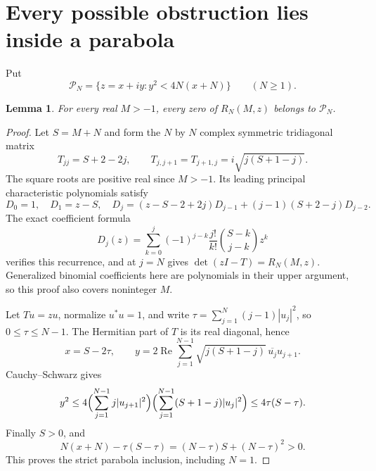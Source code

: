 \documentclass[11pt]{article}
\newtheorem{lemma}[theorem]{Lemma}
\begin{document}
\section{Every possible obstruction lies inside a parabola}
Put
\[
 \mathcal P_N=\{z=x+iy:y^2<4N(x+N)\}\qquad(N\ge1).
\]
\begin{lemma}\label{lem:inside}
For every real $M>-1$, every zero of $R_N(M,z)$ belongs to
$\mathcal P_N$.
\end{lemma}
\begin{proof}
Let $S=M+N$ and form the $N$ by $N$ complex symmetric tridiagonal matrix
\[
 T_{jj}=S+2-2j,\qquad
 T_{j,j+1}=T_{j+1,j}=i\sqrt{j(S+1-j)}.                        \tag{5}
\]
The square roots are positive real since $M>-1$. Its leading principal
characteristic polynomials satisfy
\[
 D_0=1,\quad D_1=z-S,\quad
 D_j=(z-S-2+2j)D_{j-1}+(j-1)(S+2-j)D_{j-2}.
\]
The exact coefficient formula
\[
 D_j(z)=\sum_{k=0}^j(-1)^{j-k}\frac{j!}{k!}
                           \binom{S-k}{j-k}z^k
\]
verifies this recurrence, and at $j=N$ gives
$\det(zI-T)=R_N(M,z)$. Generalized binomial coefficients here are
polynomials in their upper argument, so this proof also covers noninteger $M$.

Let $Tu=zu$, normalize $u^*u=1$, and write
$\tau=\sum_{j=1}^N(j-1)|u_j|^2$, so $0\le\tau\le N-1$.
The Hermitian part of $T$ is its real diagonal, hence
\[
 x=S-2\tau,\qquad
 y=2\operatorname{Re}\sum_{j=1}^{N-1}
                  \sqrt{j(S+1-j)}\,\overline{u_j}u_{j+1}.
\]
Cauchy--Schwarz gives
\[
 y^2\le4\Bigl(\sum_{j=1}^{N-1}j|u_{j+1}|^2\Bigr)
           \Bigl(\sum_{j=1}^{N-1}(S+1-j)|u_j|^2\Bigr)
       \le4\tau(S-\tau).
\]
Finally $S>0$, and
\[
 N(x+N)-\tau(S-\tau)
             =(N-\tau)S+(N-\tau)^2>0.                        \tag{6}
\]
This proves the strict parabola inclusion, including $N=1$.
\end{proof}
\end{document}
